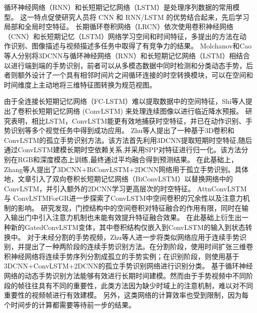 循环神经网络（RNN）\cite{jozefowicz2015empirical}和长短期记忆网络（LSTM）\cite{yue2015beyond}是处理序列数据的常用模型。
这一特点促使研究人员将 CNN 和 RNN/LSTM 的优势结合起来，先后学习局部和全局时空特征。
长期循环卷积网络（LRCN）\cite{donahue2015lrcn}依次使用卷积神经网络（CNN）和长短期记忆（LSTM）网络学习空间和时间特征，多提出的方法在动作识别、图像描述与视频描述多任务中取得了有竞争力的结果。
Molchanov\cite{molchanov2016online}和Cao\cite{cao2017egocentric}等人分别将3DCNN与循环神经网络（RNN）和长短期记忆网络（LSTM）相结合以进行端到端的手势识别，前者可以从多模态数据中同时检测和分类动态手势，后者则额外设计了一个具有相邻时间片之间循环连接的时空转换模块，可以在空间和时间维度上主动地将三维特征图转换为规范视图。

由于全连接长短期记忆网络（FC-LSTM）难以提取数据中的空间特征，Shi等人\cite{shi2015convlstm}提出了卷积长短期记忆网络 (ConvLSTM) 来处理连续图像以进行临近降水预报。
研究表明，相比LSTM，ConvLSTM能更有效地捕获时空特征，并已在动作识别、手势识别等多个视觉任务中得到成功应用。
Zhu等人\cite{zhu2017multimodal}提出了一种基于3D卷积和ConvLSTM的孤立手势识别方法。该方法首先利用3DCNN提取短期时空特征,随后通过ConvLSTM建模长期时空依赖关系,并采用SPP\cite{he2015spatial}对特征进行归一化。该方法分别在RGB和深度模态上训练,最终通过平均融合得到预测结果。
在此基础上，Zhang等人\cite{zhang2017learning}提出了3DCNN+BiConvLSTM+2DCNN网络用于孤立手势识别。具体地，文章引入了双向卷积长短期记忆网络（BiConvLSTM）以替换网络中的ConvLSTM，并引入额外的2DCNN学习更高层次的时空特征。
AttnConvLSTM\cite{zhang2018attention}与
ConvLSTMForGR\cite{zhu2019redundancy}进一步探索了ConvLSTM中空间卷积的冗余性以及注意力机制的影响。
研究发现，门控结构中的空间卷积对特征融合的作用有限，同时在输入输出门中引入注意力机制也未能有效提升特征融合效果。
在此基础上衍生出一种新的GatedConvLSTM变体，其中卷积结构仅嵌入到ConvLSTM的输入到状态转换中。
对于未经分割的手势视频，Zhu等人\cite{zhu2018continuous}进一步将类似网络应用于连续手势识别，并提出了一种两阶段的连续手势识别方法。在分割阶段，使用时间扩张三维卷积神经网络将连续手势序列分割成孤立的手势实例；在识别阶段，则使用基于3DCNN+ConvLSTM+2DCNN的孤立手势识别网络进行识别分类。
基于循环神经网络的动态手势识别方法能够有效进行长期时间建模。然而由于手势视频中不同阶段的帧往往具有不同的重要性\cite{lin2018large}，此类方法因为缺少时域上的注意机制，难以对不同重要性的视频帧进行有效建模。
另外，这类网络的计算效率也受到限制，因为每个时间步的计算都需要等待前一步的结果。

